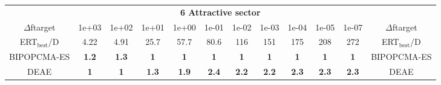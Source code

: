 \begin{tabular}{cccccccccccc}
 & \multicolumn{10}{c}{{\normalsize \textbf{6 Attractive sector}}}\\
$\Delta$ftarget& 1e+03& 1e+02& 1e+01& 1e+00& 1e-01& 1e-02& 1e-03& 1e-04& 1e-05& 1e-07 & $\Delta$ftarget \\
ERT$_{\textrm{best}}$/D& 4.22& 4.91& 25.7& 57.7& 80.6& 116& 151& 175& 208& 272 & ERT$_{\textrm{best}}$/D \\
\hline
BIPOPCMA-ES & \textbf{1.2} & \textbf{1.3} & \textbf{1} & \textbf{1} & \textbf{1} & \textbf{1} & \textbf{1} & \textbf{1} & \textbf{1} & \textbf{1} & BIPOPCMA-ES \cite{add_an_entry_for_BIPOPCMA-ES_in_bbob.bib}\\
DEAE & \textbf{1} & \textbf{1} & \textbf{1.3} & \textbf{1.9} & \textbf{2.4} & \textbf{2.2} & \textbf{2.2} & \textbf{2.3} & \textbf{2.3} & \textbf{2.3} & DEAE \cite{add_an_entry_for_DEAE_in_bbob.bib}
\end{tabular}
